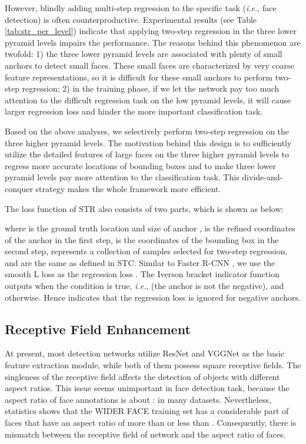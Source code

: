 \documentclass[letterpaper]{article} \usepackage{aaai19m}  \usepackage{times}  \usepackage{helvet}  \usepackage{courier}  \usepackage{url}  \usepackage{graphicx}  \usepackage{subfigure}
\def\ie{{\em i.e.}}
\begin{document}
However, blindly adding multi-step regression to the specific task (\ie, face detection) is often counterproductive. Experimental results (see Table \ref{tab:str_per_level}) indicate that applying two-step regression in the three lower pyramid levels impairs the performance. The reasons behind this phenomenon are twofold: 1) the three lower pyramid levels are associated with plenty of small anchors to detect small faces. These small faces are characterized by very coarse feature representations, so it is difficult for these small anchors to perform two-step regression; 2) in the training phase, if we let the network pay too much attention to the difficult regression task on the low pyramid levels, it will cause larger regression loss and hinder the more important classification task. 

Based on the above analyses, we selectively perform two-step regression on the three higher pyramid levels. The motivation behind this design is to sufficiently utilize the detailed features of large faces on the three higher pyramid levels to regress more accurate locations of bounding boxes and to make three lower pyramid levels pay more attention to the classification task. This divide-and-conquer strategy makes the whole framework more efficient.

The loss function of STR also consists of two parts, which is shown as below:

where  is the ground truth location and size of anchor ,  is the refined coordinates of the anchor  in the first step,  is the coordinates of the bounding box in the second step,  represents a collection of samples selected for two-step regression,  and  are the same as defined in STC. Similar to Faster R-CNN \cite{DBLP:journals/pami/RenHG017}, we use the smooth L loss as the regression loss . The Iverson bracket indicator function  outputs  when the condition is true, \ie,  (the anchor is not the negative), and  otherwise. Hence  indicates that the regression loss is ignored for negative anchors.

\subsection{Receptive Field Enhancement}
At present, most detection networks utilize ResNet and VGGNet as the basic feature extraction module, while both of them possess square receptive fields. The singleness of the receptive field affects the detection of objects with different aspect ratios. This issue seems unimportant in face detection task, because the aspect ratio of face annotations is about : in many datasets. Nevertheless, statistics shows that the WIDER FACE training set has a considerable part of faces that have an aspect ratio of more than  or less than . Consequently, there is mismatch between the receptive field of network and the aspect ratio of faces.
\end{document}

